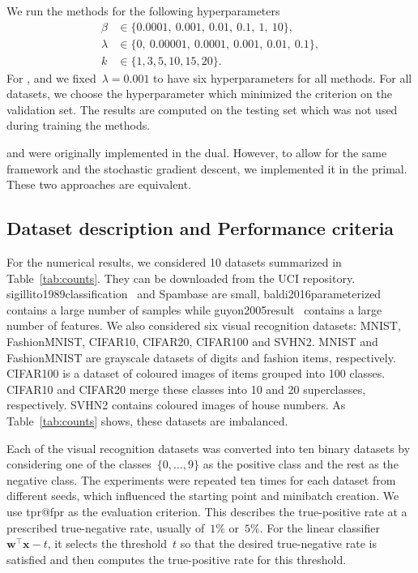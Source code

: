 We run the methods for the following hyperparameters
\begin{equation}\label{eq:beta1}
  \begin{aligned}
    \beta   & \in  \{0.0001,\ 0.001,\ 0.01,\ 0.1,\ 1,\ 10\}, \\
    \lambda & \in \{0,\ 0.00001,\ 0.0001,\ 0.001,\ 0.01,\ 0.1\}, \\
    k       & \in \{1, 3, 5, 10, 15, 20\}.
  \end{aligned}
\end{equation}
For \TopPushK, \PatMat and \PatMatNP we fixed~$\lambda=0.001$ to have six hyperparameters for all methods. For all datasets, we choose the hyperparameter which minimized the criterion on the validation set. The results are computed on the testing set which was not used during training the methods.

\TopPush and \tauFPL were originally implemented in the dual. However, to allow for the same framework and the stochastic gradient descent, we implemented it in the primal. These two approaches are equivalent.

\subsection{Dataset description and Performance criteria}\label{sec:datasets}

For the numerical results, we considered 10 datasets summarized in Table~\ref{tab:counts}. They can be downloaded from the UCI repository. sigillito1989classification~\cite{sigillito1989classification} and Spambase are small, baldi2016parameterized~\cite{baldi2016parameterized} contains a large number of samples while guyon2005result~\cite{guyon2005result} contains a large number of features. We also considered six visual recognition datasets: MNIST, FashionMNIST, CIFAR10, CIFAR20, CIFAR100 and SVHN2. MNIST and FashionMNIST are grayscale datasets of digits and fashion items, respectively. CIFAR100 is a dataset of coloured images of items grouped into 100 classes. CIFAR10 and CIFAR20 merge these classes into 10 and 20 superclasses, respectively. SVHN2 contains coloured images of house numbers. As Table~\ref{tab:counts} shows, these datasets are imbalanced.

Each of the visual recognition datasets was converted into ten binary datasets by considering one of the classes~$\{0,\dots,9\}$ as the positive class and the rest as the negative class. The experiments were repeated ten times for each dataset from different seeds, which influenced the starting point and minibatch creation. We use tpr@fpr as the evaluation criterion. This describes the true-positive rate at a prescribed true-negative rate, usually of~$1\%$ or~$5\%$. For the linear classifier~$\bm{w}^\top \bm{x} - t$, it selects the threshold~$t$ so that the desired true-negative rate is satisfied and then computes the true-positive rate for this threshold.

